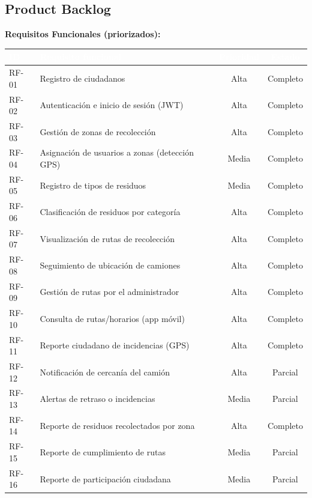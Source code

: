 \documentclass[11pt,a4paper]{article}
\newcommand{\theadcell}[1]{%
  \cellcolor{azuloscuro}\textcolor{white}{\textbf{\small #1}}}
\begin{document}
\subsection{Product Backlog}
\textbf{Requisitos Funcionales (priorizados):}
\begin{table}[H]
\centering
\renewcommand{\arraystretch}{1.25}
\begin{tabularx}{\textwidth}{|l|X|c|c|}
\hline
\theadcell{ID} & \theadcell{Requisito funcional} & \theadcell{Prioridad} & \theadcell{Estado} \\
\hline
RF-01 & Registro de ciudadanos & Alta & Completo \\
\hline
RF-02 & Autenticación e inicio de sesión (JWT) & Alta & Completo \\
\hline
RF-03 & Gestión de zonas de recolección & Alta & Completo \\
\hline
RF-04 & Asignación de usuarios a zonas (detección GPS) & Media & Completo \\
\hline
RF-05 & Registro de tipos de residuos & Media & Completo \\
\hline
RF-06 & Clasificación de residuos por categoría & Alta & Completo \\
\hline
RF-07 & Visualización de rutas de recolección & Alta & Completo \\
\hline
RF-08 & Seguimiento de ubicación de camiones & Alta & Completo \\
\hline
RF-09 & Gestión de rutas por el administrador & Alta & Completo \\
\hline
RF-10 & Consulta de rutas/horarios (app móvil) & Alta & Completo \\
\hline
RF-11 & Reporte ciudadano de incidencias (GPS) & Alta & Completo \\
\hline
RF-12 & Notificación de cercanía del camión & Alta & Parcial \\
\hline
RF-13 & Alertas de retraso o incidencias & Media & Parcial \\
\hline
RF-14 & Reporte de residuos recolectados por zona & Alta & Completo \\
\hline
RF-15 & Reporte de cumplimiento de rutas & Media & Parcial \\
\hline
RF-16 & Reporte de participación ciudadana & Media & Parcial \\
\hline
\end{tabularx}
\end{table}
\end{document}
